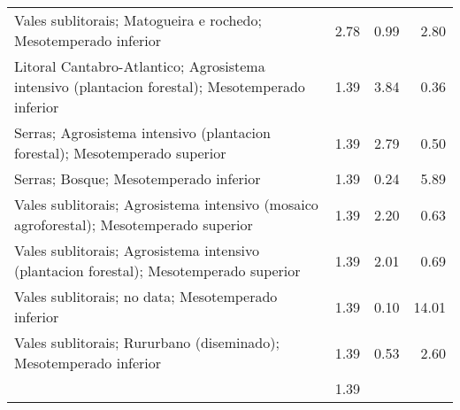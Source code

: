 \begin{table}[p]
\begin{tabular}{lrrr}
  Vales sublitorais; Matogueira e rochedo; Mesotemperado inferior & 2.78 & 0.99 & 2.80 \\ 
  Litoral Cantabro-Atlantico; Agrosistema intensivo (plantacion forestal); Mesotemperado inferior & 1.39 & 3.84 & 0.36 \\ 
  Serras; Agrosistema intensivo (plantacion forestal); Mesotemperado superior & 1.39 & 2.79 & 0.50 \\ 
  Serras; Bosque; Mesotemperado inferior & 1.39 & 0.24 & 5.89 \\ 
  Vales sublitorais; Agrosistema intensivo (mosaico agroforestal); Mesotemperado superior & 1.39 & 2.20 & 0.63 \\ 
  Vales sublitorais; Agrosistema intensivo (plantacion forestal); Mesotemperado superior & 1.39 & 2.01 & 0.69 \\ 
  Vales sublitorais; no data; Mesotemperado inferior & 1.39 & 0.10 & 14.01 \\ 
  Vales sublitorais; Rururbano (diseminado); Mesotemperado inferior & 1.39 & 0.53 & 2.60 \\ 
   & 1.39 &  &  \\ 
   \hline
\end{tabular}
\end{table}

